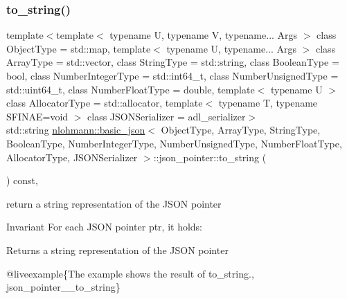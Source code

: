 \subsubsection{\texorpdfstring{to\_string()}{to\_string()}}
{\footnotesize\ttfamily template$<$template$<$ typename U, typename V, typename... Args $>$ class Object\+Type = std\+::map, template$<$ typename U, typename... Args $>$ class Array\+Type = std\+::vector, class String\+Type  = std\+::string, class Boolean\+Type  = bool, class Number\+Integer\+Type  = std\+::int64\+\_\+t, class Number\+Unsigned\+Type  = std\+::uint64\+\_\+t, class Number\+Float\+Type  = double, template$<$ typename U $>$ class Allocator\+Type = std\+::allocator, template$<$ typename T, typename S\+F\+I\+N\+A\+E=void $>$ class J\+S\+O\+N\+Serializer = adl\+\_\+serializer$>$ \\
std\+::string \mbox{\hyperlink{classnlohmann_1_1basic__json}{nlohmann\+::basic\+\_\+json}}$<$ Object\+Type, Array\+Type, String\+Type, Boolean\+Type, Number\+Integer\+Type, Number\+Unsigned\+Type, Number\+Float\+Type, Allocator\+Type, J\+S\+O\+N\+Serializer $>$\+::json\+\_\+pointer\+::to\+\_\+string (\begin{DoxyParamCaption}{ }\end{DoxyParamCaption}) const\hspace{0.3cm}{\ttfamily [inline]}, {\ttfamily [noexcept]}}



return a string representation of the J\+S\+ON pointer 

\begin{DoxyInvariant}{Invariant}
For each J\+S\+ON pointer {\ttfamily ptr}, it holds\+: 
\begin{DoxyCode}{0}
\end{DoxyCode}

\end{DoxyInvariant}
\begin{DoxyReturn}{Returns}
a string representation of the J\+S\+ON pointer
\end{DoxyReturn}
@liveexample\{The example shows the result of {\ttfamily to\+\_\+string}., json\+\_\+pointer\+\_\+\+\_\+to\+\_\+string\}


